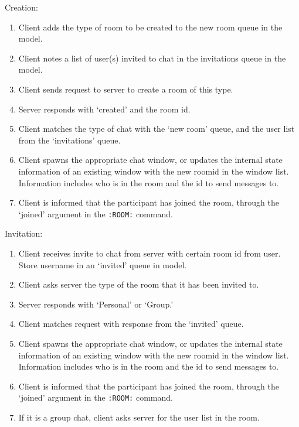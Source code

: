 Creation:
\begin{enumerate}
\item Client adds the type of room to be created to the new room queue in the model.
\item Client notes a list of user(s) invited to chat in the invitations queue in the model.
\item Client sends request to server to create a room of this type.
\item Server responds with `created' and the room id.
\item Client matches the type of chat with the `new room' queue, and the user list from the `invitations' queue.
\item Client spawns the appropriate chat window, or updates the internal state information of an existing window with the new roomid in the window list. Information includes who is in the room and the id to send messages to.
\item Client is informed that the participant has joined the room, through the `joined' argument in the \texttt{:ROOM:} command.
\end {enumerate}

Invitation:
\begin{enumerate}
\item Client receives invite to chat from server with certain room id from user. Store username in an `invited' queue in model.  
\item Client asks server the type of the room that it has been invited to.
\item Server responds with `Personal' or `Group.'
\item Client matches request with response from the `invited' queue.
\item Client spawns the appropriate chat window, or updates the internal state information of an existing window with the new roomid in the window list. Information includes who is in the room and the id to send messages to.
\item Client is informed that the participant has joined the room, through the `joined' argument in the \texttt{:ROOM:} command.
\item If it is a group chat, client asks server for the user list in the room.
\end{enumerate}

